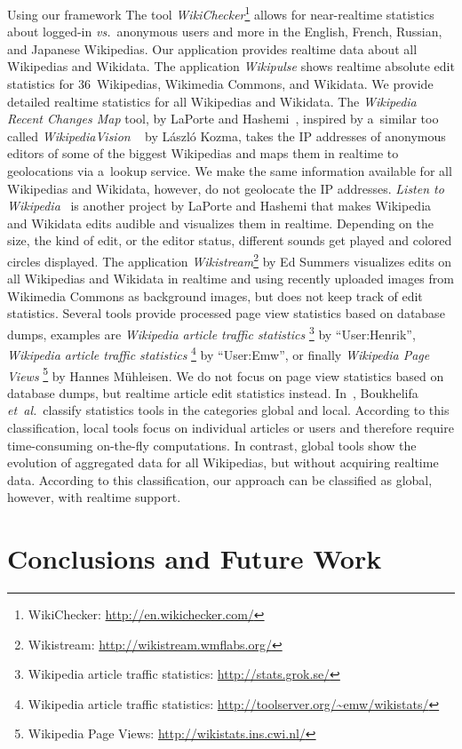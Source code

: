 \documentclass{sig-alternate}
\newcommand{\inlinelistingsize}{\fontsize{8pt}{11pt}}
\let\oldurl\url
\renewcommand{\url}[1]{\inlinelistingsize\oldurl{#1}}
\begin{document}
Using our framework
The tool \emph{WikiChecker}\footnote{WikiChecker:
\url{http://en.wikichecker.com/}}
allows for near-realtime statistics
about logged-in \emph{vs.}\ anonymous users and more in
the English, French, Russian, and Japanese Wikipedias.
Our application provides realtime data about all Wikipedias and Wikidata.
The application \emph{Wikipulse} shows realtime absolute
edit statistics for 36~Wikipedias, Wikimedia Commons, and Wikidata.
We provide detailed realtime statistics for all Wikipedias and Wikidata.
The \emph{Wikipedia Recent Changes Map} tool,
by LaPorte and Hashemi~\cite{laporte2013map},
inspired by a~similar too called \emph{WikipediaVision}%
~\cite{kozma2013map} by László Kozma,
takes the IP addresses of anonymous editors
of some of the biggest Wikipedias and maps them
in realtime to geolocations via a~lookup service.
We make the same information available
for all Wikipedias and Wikidata, however,
do not geolocate the IP addresses.
\emph{Listen to Wikipedia}~\cite{laporte2013listen}
is another project by
LaPorte and Hashemi that makes Wikipedia and Wikidata edits
audible and visualizes them in realtime.
Depending on the size, the kind of edit, or the editor status,
different sounds get played and colored circles displayed.
The application \emph{Wikistream}\footnote{Wikistream:
\url{http://wikistream.wmflabs.org/}} by Ed Summers
visualizes edits on all Wikipedias and Wikidata
in realtime and using recently uploaded images from Wikimedia Commons
as background images, but does not keep track of edit statistics.
Several tools provide processed page view statistics
based on database dumps, examples are
\emph{Wikipedia article traffic statistics}%
\footnote{Wikipedia article traffic statistics:
\url{http://stats.grok.se/}} by ``User:Henrik'',
\emph{Wikipedia article traffic statistics}%
\footnote{Wikipedia article traffic statistics:
\url{http://toolserver.org/~emw/wikistats/}} by ``User:Emw'',
or finally \emph{Wikipedia Page Views}%
\footnote{Wikipedia Page Views: \url{http://wikistats.ins.cwi.nl/}}
by Hannes Mühleisen.
We do not focus on page view statistics based on database dumps,
but realtime article edit statistics instead.
In~\cite{boukhelifa2010realtime}, Boukhelifa \emph{et~al.}\
classify statistics tools in the categories global and local.
According to this classification,
local tools focus on individual articles or users
and therefore require time-consuming on-the-fly computations.
In contrast,  global tools
show the evolution of aggregated data
for all Wikipedias,
but without acquiring realtime data.
According to this classification, our approach can be
classified as global, however, with realtime support.

\section{Conclusions and Future Work}
 


\balancecolumns
\end{document}
